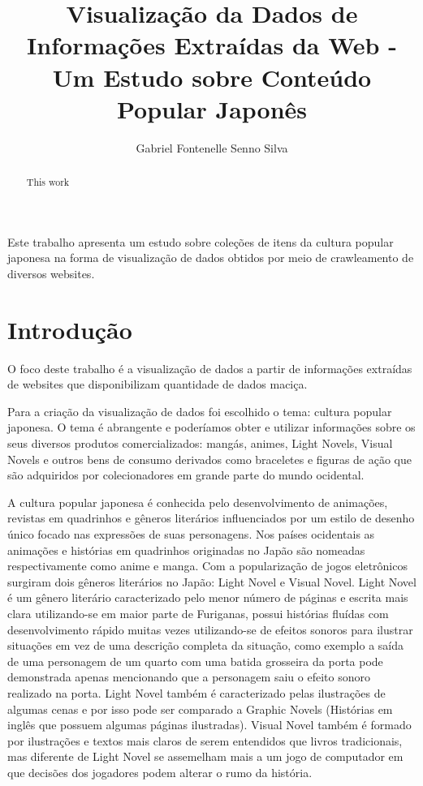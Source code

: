 \documentclass[12pt]{article}
\title{Visualização da Dados de Informações Extraídas da Web - Um Estudo sobre Conteúdo Popular Japonês}
\author{Gabriel Fontenelle Senno Silva\inst{1}}
\begin{document}
 
\maketitle

\begin{abstract}

This work 
\end{abstract}
     
\begin{resumo} 


Este trabalho apresenta um estudo sobre coleções de itens da cultura popular japonesa na forma de visualização de dados obtidos por meio de crawleamento de diversos websites.

\end{resumo}


\section{Introdução}

O foco deste trabalho é a visualização de dados a partir de informações extraídas de websites que disponibilizam quantidade de dados maciça.

Para a criação da visualização de dados foi escolhido o tema: cultura popular japonesa. O tema é abrangente e poderíamos obter e utilizar informações sobre os seus diversos produtos comercializados: mangás, animes, Light Novels, Visual Novels e outros bens de consumo derivados como braceletes e figuras de ação que são adquiridos por colecionadores em grande parte do mundo ocidental.

A cultura popular japonesa é conhecida pelo desenvolvimento de animações, revistas em quadrinhos e gêneros literários influenciados por um estilo de desenho único focado nas expressões de suas personagens. Nos países ocidentais as animações e histórias em quadrinhos originadas no Japão são nomeadas respectivamente como anime e manga.
Com a popularização de jogos eletrônicos surgiram dois gêneros literários no Japão: Light Novel e Visual Novel. Light Novel é um gênero literário caracterizado pelo menor número de páginas e escrita mais clara utilizando-se em maior parte de Furiganas, possui histórias fluídas com desenvolvimento rápido muitas vezes utilizando-se de efeitos sonoros para ilustrar situações em vez de uma descrição completa da situação, como exemplo a saída de uma personagem de um quarto com uma batida grosseira da porta pode demonstrada apenas mencionando que a personagem saiu o efeito sonoro realizado na porta. Light Novel também é caracterizado pelas ilustrações de algumas cenas e por isso pode ser comparado a Graphic Novels (Histórias em inglês que possuem algumas páginas ilustradas). Visual Novel também é formado por ilustrações e textos mais claros de serem entendidos que livros tradicionais, mas diferente de Light Novel se assemelham mais a um jogo de computador em que decisões dos jogadores podem alterar o rumo da história.
\end{document}
